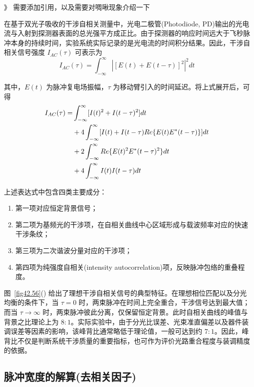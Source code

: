 》 需要添加引用，以及需要对啁啾现象介绍一下

在基于双光子吸收的干涉自相关测量中，光电二极管(Photodiode, PD)输出的光电流与入射到探测器表面的总光强平方成正比。由于探测器的响应时间远大于飞秒脉冲本身的持续时间，实验系统实际记录的是光电流的时间积分结果。因此，干涉自相关信号强度 $I_{AC}(\tau)$ 可表示为
\begin{equation}
    I_{AC}(\tau)=\int_{-\infty}^{\infty}|[E(t)+E(t-\tau)]^{2}|^{2}dt
\end{equation}

其中，$E(t)$ 为脉冲复电场振幅，$\tau$ 为移动臂引入的时间延迟。将上式展开后，可得
\begin{align}
    I_{AC}(\tau)=&\int_{-\infty}^{\infty}[I(t)^{2}+I(t-\tau)^{2}]dt\\ \notag
    &+4\int_{-\infty}^{\infty}[I(t)+I(t-\tau)Re\{E(t)E^{*}(t-\tau)\}]dt\\ \notag
    &+2\int_{-\infty}^{\infty}Re\{E(t)^{2}E^{*}(t-\tau)^{2}\}dt\\ \notag
    &+4\int_{-\infty}^{\infty}I(t)I(t-\tau)dt
\end{align}

上述表达式中包含四类主要成分：
\begin{enumerate}
    \item 第一项对应恒定背景信号；
    \item 第二项为基频光的干涉项，在自相关曲线中心区域形成与载波频率对应的快速干涉条纹；
    \item 第三项为二次谐波分量对应的干涉项；
    \item 第四项为纯强度自相关(intensity autocorrelation)项，反映脉冲包络的重叠程度。
\end{enumerate}

图~\ref{fig42.56}() 给出了理想干涉自相关信号的典型特征。在理想相位匹配以及分光均衡的条件下，当 $\tau=0$ 时，两束脉冲在时间上完全重合，干涉信号达到最大值；而当 $\tau \rightarrow \infty$ 时，两束脉冲彼此分离，仅保留恒定背景。此时自相关曲线的峰值与背景之比理论上为 $8:1$。实际实验中，由于分光比误差、光束准直偏差以及器件装调误差等因素的影响，该峰背比通常略低于理论值，一般可达到约 $7:1$。因此，峰背比不仅是判断系统干涉质量的重要指标，也可作为评价光路重合程度与装调精度的依据。




\subsection{脉冲宽度的解算(去相关因子)}\label{6.1.2}

